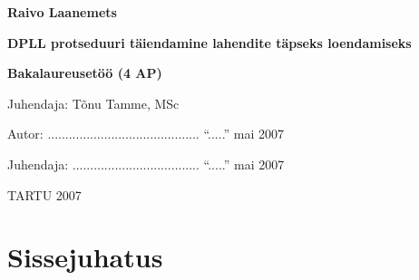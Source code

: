 \documentclass[12pt,estonian]{report}
\begin{document}

\thispagestyle{empty}

\begin{center}
{\large{}}


{\textbf{\Large Raivo Laanemets}}

\vspace{4mm}

{\textbf{\LARGE DPLL protseduuri täiendamine lahendite täpseks loendamiseks}}

\vspace{5mm}

{\textbf{\Large Bakalaureusetöö (4 AP)}}

\end{center}


{\hfill{\Large Juhendaja: Tõnu Tamme, MSc}}


\begin{flushright}

\noindent Autor: ........................................... ``.....'' mai\hskip16pt 2007

\vspace{2mm}

\noindent Juhendaja: .................................... ``.....'' mai\hskip16pt 2007

\end{flushright}


\begin{center}
{\large{TARTU 2007}}
\end{center}


\newpage

\tableofcontents{}

\chapter*{Sissejuhatus}
\end{document}
